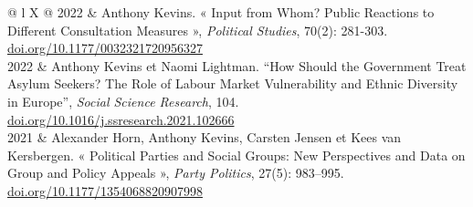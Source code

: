 \documentclass[letterpaper,fontsize=10.5pt]{scrartcl}
\begin{document}
\begin{longtblr}[entry=none,label=none]{@{} l X @{}}
	2022          & Anthony Kevins. « Input from Whom? Public Reactions to Different Consultation Measures », \textit{Political Studies}, 70(2): 281-303. \href{https://doi.org/10.1177/0032321720956327}{doi.org/10.1177/0032321720956327}                                                                                                                     \\
	2022          & Anthony Kevins et Naomi Lightman. ``How Should the Government Treat Asylum Seekers? The Role of Labour Market Vulnerability and Ethnic Diversity in Europe'', \textit{Social Science Research}, 104. \href{https://doi.org/10.1016/j.ssresearch.2021.102666}{doi.org/10.1016/j.ssresearch.2021.102666}                                        \\
	2021 & Alexander Horn, Anthony Kevins, Carsten Jensen et Kees van Kersbergen. « Political Parties and Social Groups: New Perspectives and Data on Group and Policy Appeals », \textit{Party Politics}, 27(5): 983–995. \href{https://doi.org/10.1177/1354068820907998}{doi.org/10.1177/1354068820907998}                                             \\
	

\end{longtblr}
\end{document}
